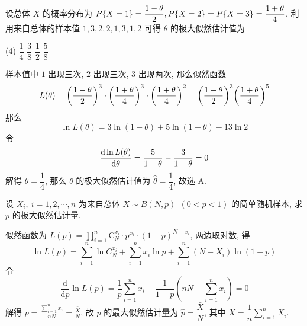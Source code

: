 \begin{example}
    设总体 $X$ 的概率分布为 $P\qty{X=1}=\dfrac{1-\theta}{2},P\qty{X=2}=P\qty{X=3}=\dfrac{1+\theta}{4}$, 利用来自总体的样本值 $1,3,2,2,1,3,1,2$ 可得 $\theta$ 的极大似然估计值为
    \begin{tasks}(4)
        \task $\dfrac{1}{4}$
        \task $\dfrac{3}{8}$
        \task $\dfrac{1}{2}$
        \task $\dfrac{5}{8}$
    \end{tasks}
\end{example}
\begin{solution}
    样本值中 $1$ 出现三次, $2$ 出现三次, $3$ 出现两次, 那么似然函数 
    $$
    L(\theta)=\qty(\dfrac{1-\theta}{2})^3\cdot \qty(\dfrac{1+\theta}{4})^3\cdot \qty(\dfrac{1+\theta}{4})^2=\qty(\dfrac{1-\theta}{2})^3\qty(\dfrac{1+\theta}{4})^5
    $$
    那么 
    $$
    \ln L(\theta)=3\ln(1-\theta)+5\ln(1+\theta)-13\ln 2
    $$
    令 $$
    \dv{\ln L(\theta)}{\theta}=\dfrac{5}{1+\theta}-\dfrac{3}{1-\theta}=0
    $$
    解得 $\theta=\dfrac{1}{4}$, 那么 $\theta$ 的极大似然估计值为 $\hat{\theta}=\dfrac{1}{4}$, 故选 A.
\end{solution}

\begin{example}
    设 $X_i,~i=1,2,\cdots,n$ 为来自总体 $X\sim B(N,p)~~(0<p<1)$ 的简单随机样本, 求 $p$ 的极大似然估计量.
\end{example}
\begin{solution}
    似然函数为 $\displaystyle L(p)=\prod_{i=1}^{n} \mathrm{C}_{N}^{x_{i}} \cdot p^{x_{i}} \cdot(1-p)^{N-x_{i}} $, 两边取对数, 得
    $$\ln L(p)=\sum_{i=1}^{n} \ln C_{N}^{x_{i}}+\sum_{i=1}^{n} x_{i} \ln p+\sum_{i=1}^{n}\left(N-X_{i}\right) \ln (1-p)$$
    令 $$\frac{\mathrm{d}}{\mathrm{d} p} \ln L(p)=\frac{1}{p} \sum_{i=1}^{n} x_{i}-\frac{1}{1-p}\left(n N-\sum_{i=1}^{n} x_{i}\right)=0$$
    解得 $\displaystyle p=\frac{\displaystyle \sum_{i=1}^{n} x_{i}}{n N}=\frac{\bar{X}}{N} $, 故 $ p $ 的最大似然估计量为 $ \hat{p}=\dfrac{\bar{X}}{N} $,
    其中 $ \displaystyle\bar{X}=\dfrac{1}{n} \sum_{i=1}^{n} X_{i} .$
\end{solution}

